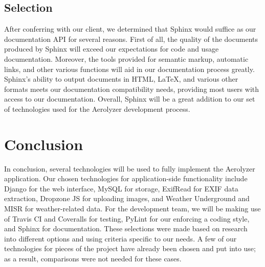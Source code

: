 \documentclass[onecolumn, draftclsnofoot,10pt, compsoc]{IEEEtran}
\begin{document}
\begin{flushleft}
\subsection{Selection}
After conferring with our client, we determined that Sphinx would suffice as our documentation API for several reasons. First of all, the quality of the documents produced by Sphinx will exceed our expectations for code and usage documentation. Moreover, the tools provided for semantic markup, automatic links, and other various functions will aid in our documentation process greatly. Sphinx's ability to output documents in HTML, LaTeX, and various other formats meets our documentation compatibility needs, providing most users with access to our documentation. Overall, Sphinx will be a great addition to our set of technologies used for the Aerolyzer development process.

\section{Conclusion}
In conclusion, several technologies will be used to fully implement the Aerolyzer application. Our chosen technologies for application-side functionality include Django for the web interface, MySQL for storage, ExifRead for EXIF data extraction, Dropzone JS for uploading images, and Weather Underground and MISR for weather-related data. For the development team, we will be making use of  Travis CI and Coveralls for testing, PyLint for our enforcing a coding style, and Sphinx for documentation. These selections were made based on research into different options and using criteria specific to our needs. A few of our technologies for pieces of the project have already been chosen and put into use; as a result, comparisons were not needed for these cases.\cite{21} 

\end{flushleft}


\clearpage



\end{document}
